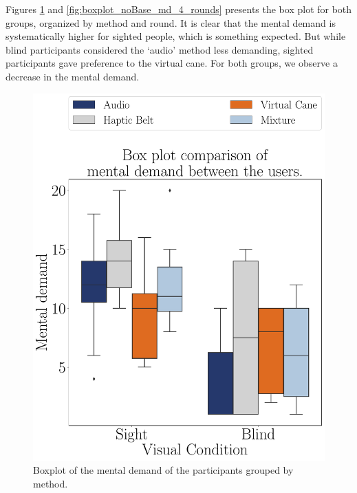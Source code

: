 Figures \ref{fig:boxplot_noBase_md_4_scene} and \ref{fig:boxplot_noBase_md_4_rounds} presents the box plot for both groups, organized by method and round. It is clear that the mental demand is systematically higher for sighted people, which is something expected. But while blind participants considered the ‘audio’ method less demanding, sighted participants gave preference to the virtual cane. For both groups, we observe a decrease in the mental demand.

\begin{figure}[!htb]
    \centering
    \begin{minipage}{0.45\textwidth}
        \centering
        \includegraphics[width = 0.8\linewidth]{Resultados/Nasa/Figuras/pdf/boxplot_noBase_md_4_scene.pdf}
        \caption{Boxplot of the mental demand of the participants grouped by method.}
        \label{fig:boxplot_noBase_md_4_scene}
    \end{minipage}
    \begin{minipage}{0.075\textwidth}
        \hfill
    \end{minipage}
    \begin{minipage}{0.45\textwidth}
        \centering

\end{minipage}
\end{figure}
